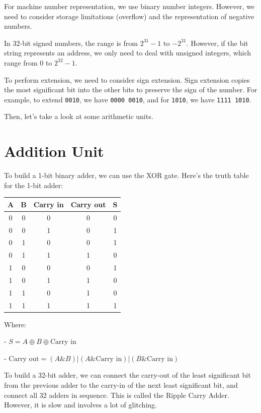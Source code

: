For machine number representation, we use binary number integers. However, we need to consider storage limitations (overflow) and the representation of negative numbers.

In 32-bit signed numbers, the range is from \(2^{31} - 1\) to \(-2^{31}\). However, if the bit string represents an address, we only need to deal with unsigned integers, which range from 0 to \(2^{32} - 1\).

To perform extension, we need to consider sign extension. Sign extension copies the most significant bit into the other bits to preserve the sign of the number. For example, to extend \verb|0010|, we have \verb|0000 0010|, and for \verb|1010|, we have \verb|1111 1010|.

Then, let's take a look at some arithmetic units.

\section{Addition Unit}
To build a 1-bit binary adder, we can use the XOR gate. Here's the truth table for the 1-bit adder:

\begin{table}[H]
  \centering
  \begin{tabular}{c|c|c|c|c}
      \toprule
      A & B & Carry in & Carry out & S  \\
    \midrule
      0 & 0 & 0 & 0 & 0  \\
      0 & 0 & 1 & 0 & 1  \\
      0 & 1 & 0 & 0 & 1  \\
      0 & 1 & 1 & 1 & 0  \\
      1 & 0 & 0 & 0 & 1  \\
      1 & 0 & 1 & 1 & 0  \\
      1 & 1 & 0 & 1 & 0  \\
      1 & 1 & 1 & 1 & 1  \\
      \bottomrule
  \end{tabular}
\end{table}
Where:

- \( S = A \oplus B \oplus \text{Carry in} \)

- \( \text{Carry out} = (A \& B) | (A \& \text{Carry in}) | (B \& \text{Carry in}) \)

To build a 32-bit adder, we can connect the carry-out of the least significant bit from the previous adder to the carry-in of the next least significant bit, and connect all 32 adders in sequence. This is called the Ripple Carry Adder. However, it is slow and involves a lot of glitching.

